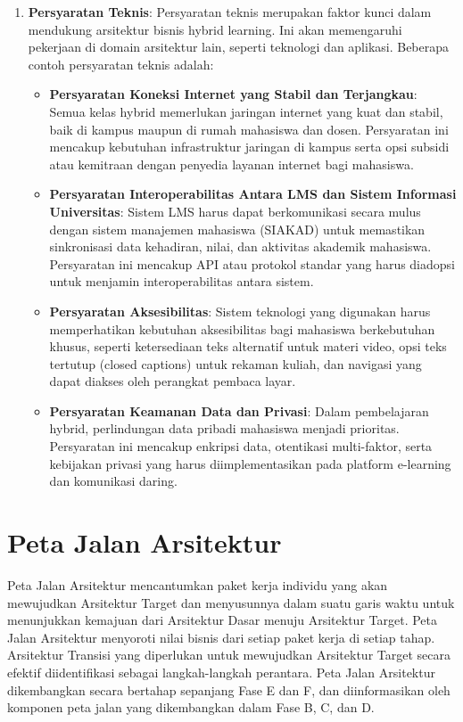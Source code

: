 \begin{enumerate}
	\item \textbf{Persyaratan Teknis}:  
	Persyaratan teknis merupakan faktor kunci dalam mendukung arsitektur bisnis hybrid learning. Ini akan memengaruhi pekerjaan di domain arsitektur lain, seperti teknologi dan aplikasi. Beberapa contoh persyaratan teknis adalah:
	\begin{itemize}
		\item \textbf{Persyaratan Koneksi Internet yang Stabil dan Terjangkau}: Semua kelas hybrid memerlukan jaringan internet yang kuat dan stabil, baik di kampus maupun di rumah mahasiswa dan dosen. Persyaratan ini mencakup kebutuhan infrastruktur jaringan di kampus serta opsi subsidi atau kemitraan dengan penyedia layanan internet bagi mahasiswa.
		\item \textbf{Persyaratan Interoperabilitas Antara LMS dan Sistem Informasi Universitas}: Sistem LMS harus dapat berkomunikasi secara mulus dengan sistem manajemen mahasiswa (SIAKAD) untuk memastikan sinkronisasi data kehadiran, nilai, dan aktivitas akademik mahasiswa. Persyaratan ini mencakup API atau protokol standar yang harus diadopsi untuk menjamin interoperabilitas antara sistem.
		\item \textbf{Persyaratan Aksesibilitas}: Sistem teknologi yang digunakan harus memperhatikan kebutuhan aksesibilitas bagi mahasiswa berkebutuhan khusus, seperti ketersediaan teks alternatif untuk materi video, opsi teks tertutup (closed captions) untuk rekaman kuliah, dan navigasi yang dapat diakses oleh perangkat pembaca layar.
		\item \textbf{Persyaratan Keamanan Data dan Privasi}: Dalam pembelajaran hybrid, perlindungan data pribadi mahasiswa menjadi prioritas. Persyaratan ini mencakup enkripsi data, otentikasi multi-faktor, serta kebijakan privasi yang harus diimplementasikan pada platform e-learning dan komunikasi daring.
	\end{itemize}
\end{enumerate}

\section{Peta Jalan Arsitektur}
Peta Jalan Arsitektur mencantumkan paket kerja individu yang akan mewujudkan Arsitektur Target dan menyusunnya dalam suatu garis waktu untuk menunjukkan kemajuan dari Arsitektur Dasar menuju Arsitektur Target. Peta Jalan Arsitektur menyoroti nilai bisnis dari setiap paket kerja di setiap tahap. Arsitektur Transisi yang diperlukan untuk mewujudkan Arsitektur Target secara efektif diidentifikasi sebagai langkah-langkah perantara. Peta Jalan Arsitektur dikembangkan secara bertahap sepanjang Fase E dan F, dan diinformasikan oleh komponen peta jalan yang dikembangkan dalam Fase B, C, dan D.

